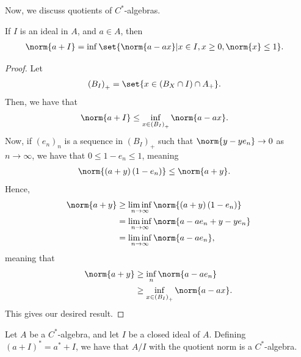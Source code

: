 \documentclass[10pt]{mypackage}
\begin{document}
Now, we discuss quotients of $C^{\ast}$-algebras. 
\begin{lemma}
  If $I$ is an ideal in $A$, and $a\in A$, then
  \begin{align*}
    \norm{a + I} &= \inf\set{\norm{a-ax} | x\in I, x\geq 0,\norm{x}\leq 1}.
  \end{align*}
\end{lemma}
\begin{proof}
  Let
  \begin{align*}
    \left( B_I \right)_{+} &= \set{x\in \left( B_X\cap I \right)\cap A_{+}}.
  \end{align*}
  Then, we have that
  \begin{align*}
    \norm{a + I} &\leq \inf_{x\in \left( B_I \right)_{+}} \norm{a-ax}.
  \end{align*}
  Now, if $\left( e_n \right)_n$ is a sequence in $\left( B_{I} \right)_{+}$ such that $\norm{y-ye_n}\rightarrow 0$ as $n\rightarrow\infty$, we have that $0\leq 1-e_n \leq 1$, meaning
  \begin{align*}
    \norm{\left( a + y \right)\left( 1-e_n \right)} &\leq \norm{a+y}.
  \end{align*}
  Hence,
  \begin{align*}
    \norm{a+y} &\geq \liminf_{n\rightarrow\infty} \norm{\left( a+y \right)\left( 1-e_n \right)}\\
               &= \liminf_{n\rightarrow\infty}\norm{a-ae_n + y-ye_n}\\
               &= \liminf_{n\rightarrow\infty} \norm{a-ae_n},
  \end{align*}
  meaning that
  \begin{align*}
    \norm{a+y} &\geq \inf_{n} \norm{a-ae_n}\\
               &\geq \inf_{x\in \left( B_{I} \right)_{+}} \norm{a-ax}.
  \end{align*}
  This gives our desired result.
\end{proof}
\begin{theorem}
  Let $A$ be a $C^{\ast}$-algebra, and let $I$ be a closed ideal of $A$. Defining $\left( a+I \right)^{\ast} = a^{\ast} + I$, we have that $A/I$ with the quotient norm is a $C^{\ast}$-algebra.
\end{theorem}
\end{document}
